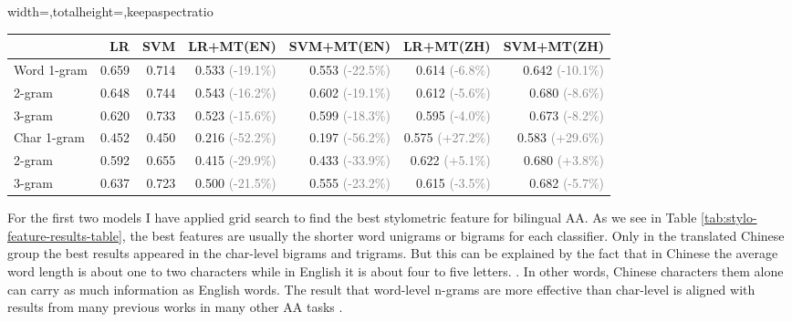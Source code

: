 \documentclass[11pt,a4paper]{article}
\begin{document}
\begin{table*}[t]
  \begin{center}
  \begin{adjustbox}{width={\textwidth},totalheight={\textheight},keepaspectratio}%
  \begin{tabular}{|l|r|r|r|r|r|r|}
  \hline & \bf LR & \bf SVM & \bf LR+MT(EN) & \bf SVM+MT(EN) & \bf LR+MT(ZH) & \bf SVM+MT(ZH) \\ \hline
  Word 1-gram & 0.659 & 0.714 & 0.533 \textcolor{gray}{(-19.1\%)} & 0.553 \textcolor{gray}{(-22.5\%)} & 0.614 \textcolor{gray}{(-6.8\%)} & 0.642 \textcolor{gray}{(-10.1\%)} \\
  \hspace{0.5cm} 2-gram & 0.648 & 0.744 & 0.543 \textcolor{gray}{(-16.2\%)} & 0.602 \textcolor{gray}{(-19.1\%)} & 0.612 \textcolor{gray}{(-5.6\%)} & 0.680 \textcolor{gray}{(-8.6\%)} \\
  \hspace{0.5cm} 3-gram & 0.620 & 0.733 & 0.523 \textcolor{gray}{(-15.6\%)} & 0.599 \textcolor{gray}{(-18.3\%)} & 0.595 \textcolor{gray}{(-4.0\%)} & 0.673 \textcolor{gray}{(-8.2\%)} \\
  Char 1-gram & 0.452 & 0.450 & 0.216 \textcolor{gray}{(-52.2\%)} & 0.197 \textcolor{gray}{(-56.2\%)} & 0.575 \textcolor{gray}{(+27.2\%)} & 0.583 \textcolor{gray}{(+29.6\%)} \\
  \hspace{0.5cm} 2-gram & 0.592 & 0.655 & 0.415 \textcolor{gray}{(-29.9\%)} & 0.433 \textcolor{gray}{(-33.9\%)} & 0.622 \textcolor{gray}{(+5.1\%)} & 0.680 \textcolor{gray}{(+3.8\%)} \\
  \hspace{0.5cm} 3-gram & 0.637 & 0.723 & 0.500 \textcolor{gray}{(-21.5\%)} & 0.555 \textcolor{gray}{(-23.2\%)} & 0.615 \textcolor{gray}{(-3.5\%)} & 0.682 \textcolor{gray}{(-5.7\%)} \\
  \hline
  \end{tabular}
\end{adjustbox}
  \end{center}
  \caption{\label{tab:stylo-feature-results-table} Results for the Vanilla Model and the Machine Translation Model}
\end{table*}

For the first two models I have applied grid search to find the best stylometric feature for bilingual AA. As we see in Table \ref{tab:stylo-feature-results-table}, the best features are usually the shorter word unigrams or bigrams for each classifier. Only in the translated Chinese group the best results appeared in the char-level bigrams and trigrams. But this can be explained by the fact that in Chinese the average word length is about one to two characters while in English it is about four to five letters.  \cite{chen2015does} \cite{bochkarev2015average}. In other words, Chinese characters them alone can carry as much information as English words. The result that word-level n-grams are more effective than char-level is aligned with results from many previous works in many other AA tasks \cite{kestemont2018overview} \cite{rangel2019overview}.
\end{document}
